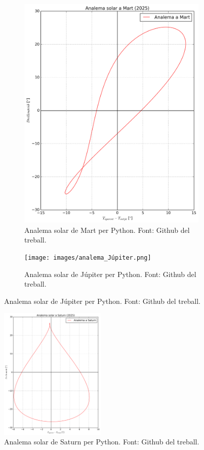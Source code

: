 \documentclass[a4paper, 11pt]{article}
\begin{document}
\begin{figure}[h!]
\begin{subfigure}{0.45\textwidth}
        \includegraphics[width=\textwidth]{images/analema_Mart.png}
        \caption{Analema solar de Mart per Python. Font: Github del treball.}
    \end{subfigure}
    \hspace{0.05\textwidth}
    \begin{subfigure}{0.45\textwidth}
        \centering
        \texttt{[image: images/analema\_Júpiter.png]}
        \caption{Analema solar de Júpiter per Python. Font: Github del treball.}
    \end{subfigure}
\end{figure}

    \newpage

\begin{figure}[h!]
    \centering
    \includegraphics[width=0.45\textwidth]{images/analema_Saturn.png}
    \caption{Analema solar de Saturn per Python. Font: Github del treball.}
\end{figure}


\newpage
\printbibliography
\end{document}
